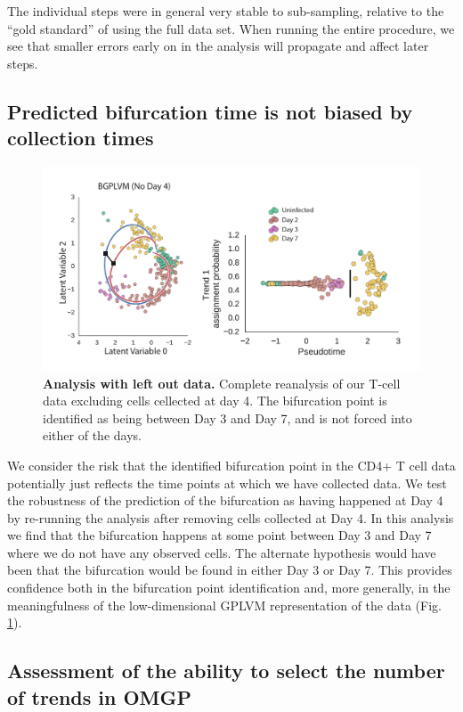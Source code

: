 The individual steps were in general very stable to sub-sampling, relative to the ``gold standard'' of using the full data set. When running the entire procedure, we see that smaller errors early on in the analysis will propagate and affect later steps.

\subsection{Predicted bifurcation time is not biased by collection times}

\begin{figure}
    \centering
    \includegraphics[width=\textwidth]{"fig-no-day4"}
    \caption[Analysis with left out data]{\textbf{Analysis with left out data.} Complete reanalysis of our T-cell data excluding cells cellected at day 4. The bifurcation point is identified as being between Day 3 and Day 7, and is not forced into either of the days.}
    \label{fig:no-day4}
\end{figure}

We consider the risk that the identified bifurcation point in the CD4+ T cell data potentially just reflects the time points at which we have collected data. We test the robustness of the prediction of the bifurcation as having happened at Day 4 by re-running the analysis after removing cells collected at Day 4. In this analysis we find that the bifurcation happens at some point between Day 3 and Day 7 where we do not have any observed cells. The alternate hypothesis would have been that the bifurcation would be found in either Day 3 or Day 7. This provides confidence both in the bifurcation point identification and, more generally, in the meaningfulness of the low-dimensional GPLVM representation of the data (Fig. \ref{fig:no-day4}).

\subsection{Assessment of the ability to select the number of trends in OMGP}

